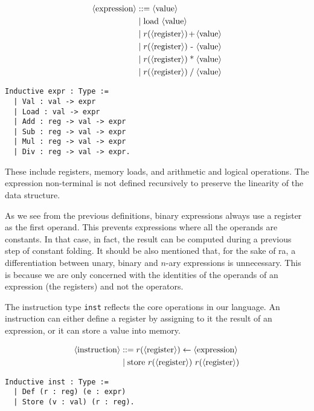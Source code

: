 \begin{minipage}{0.45\textwidth}
\begin{align*}
\nt{expression} &::= \nt{value} \\
&\mid \text{load} \ \nt{value} \\
&\mid r( \nt{register} ) \makebox[1em]{+} \nt{value} \\
&\mid r( \nt{register} ) \makebox[1em]{-} \nt{value} \\
&\mid r( \nt{register} ) \makebox[1em]{*} \nt{value} \\
&\mid r( \nt{register} ) \makebox[1em]{/} \nt{value} \\
\end{align*}
\end{minipage}
\hfill
\begin{minipage}{0.45\textwidth}
\begin{lstlisting}[style=Rocq]
Inductive expr : Type :=
  | Val : val -> expr
  | Load : val -> expr
  | Add : reg -> val -> expr
  | Sub : reg -> val -> expr
  | Mul : reg -> val -> expr
  | Div : reg -> val -> expr.
\end{lstlisting}
\end{minipage}

These include registers, memory loads, and arithmetic and logical operations. The expression non-terminal is not defined recursively to preserve the linearity of the data structure.

As we see from the previous definitions, binary expressions always use a register as the first operand. This prevents expressions where all the operands are constants. In that case, in fact, the result can be computed during a previous step of constant folding. It should be also mentioned that, for the sake of \gls{ra}, a differentiation between unary, binary and $n$-ary expressions is unnecessary. This is because we are only concerned with the identities of the operands of an expression (the registers) and not the operators.

The instruction type \texttt{inst} reflects the core operations in our language. An instruction can either define a register by assigning to it the result of an expression, or it can store a value into memory.

\begin{minipage}{0.55\linewidth}
\begin{align*}
\langle\text{instruction}\rangle &::= r( \langle\text{register}\rangle ) \leftarrow \langle\text{expression}\rangle \\
&\mid \text{store} \ r( \langle\text{register}\rangle ) \ r( \langle\text{register}\rangle ) \\
\end{align*}
\end{minipage}
\hfill
\begin{minipage}{0.41\linewidth}
\begin{lstlisting}[style=Rocq]
Inductive inst : Type :=
  | Def (r : reg) (e : expr)
  | Store (v : val) (r : reg).
\end{lstlisting}
\end{minipage}


